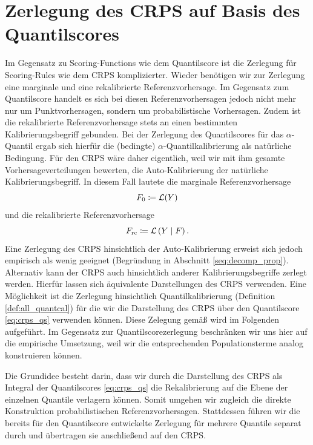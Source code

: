 \section{Zerlegung des CRPS auf Basis des Quantilscores} \label{seq:decomp_crps}
Im Gegensatz zu Scoring-Functions wie dem Quantilscore ist die Zerlegung für Scoring-Rules wie dem CRPS komplizierter. Wieder benötigen wir zur Zerlegung eine marginale und eine rekalibrierte Referenzvorhersage. Im Gegensatz zum Quantilscore handelt es sich bei diesen Referenzvorhersagen jedoch nicht mehr nur um Punktvorhersagen, sondern um probabilistische Vorhersagen. Zudem ist die rekalibrierte Referenzvorhersage stets an einen bestimmten Kalibrierungsbegriff gebunden. Bei der Zerlegung des Quantilscores für das $\alpha$-Quantil ergab sich hierfür die (bedingte) $\alpha$-Quantilkalibrierung als natürliche Bedingung. Für den CRPS wäre daher eigentlich, weil wir mit ihm gesamte Vorhersageverteilungen bewerten, die Auto-Kalibrierung der natürliche Kalibrierungsbegriff. In diesem Fall lautete die marginale Referenzvorhersage
\begin{equation}\label{eq:marg_ref_crps}
    F_0 \coloneqq \mathcal{L}(Y)
\end{equation}
und die rekalibrierte Referenzvorhersage 
\[
F_{\mathrm{rc}}\coloneqq \mathcal{L} \left(Y \mid F \right).
\] 
Eine Zerlegung des CRPS hinsichtlich der Auto-Kalibrierung erweist sich jedoch empirisch als wenig geeignet (Begründung in Abschnitt \ref{seq:decomp_prop}). Alternativ kann der CRPS auch hinsichtlich anderer Kalibrierungsbegriffe zerlegt werden. Hierfür lassen sich äquivalente Darstellungen des CRPS verwenden. Eine Möglichkeit ist die Zerlegung hinsichtlich Quantilkalibrierung (Definition \ref{def:all_quantcal}) für die wir die Darstellung des CRPS über den Quantilscore \eqref{eq:crps_qs} verwenden können. 
Diese Zelegung gemäß \textcite{arnold2024decompositions} wird im Folgenden aufgeführt. Im Gegensatz zur Quantilscorezerlegung beschränken wir uns hier auf die empirische Umsetzung, weil wir die entsprechenden Populationsterme analog konstruieren können.

Die Grundidee besteht darin, dass wir durch die Darstellung des CRPS als Integral der Quantilscores \eqref{eq:crps_qs} die Rekalibrierung auf die Ebene der einzelnen Quantile verlagern können. Somit umgehen wir zugleich die direkte Konstruktion probabilistischen Referenzvorhersagen. Stattdessen führen wir die bereits für den Quantilscore entwickelte Zerlegung für mehrere Quantile separat durch und übertragen sie anschließend auf den CRPS. 


